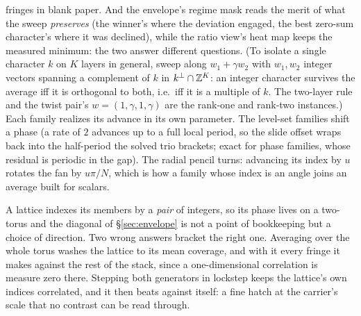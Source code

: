 fringes in blank paper. And the envelope's regime mask reads the merit of
what the sweep \emph{preserves} (the winner's where the deviation engaged,
the best zero-sum character's where it was declined), while the ratio view's
heat map keeps the measured minimum: the two answer different questions. (To isolate a single character $k$ on $K$ layers in
general, sweep along $w_1+\gamma w_2$ with $w_1,w_2$ integer vectors spanning
a complement of $k$ in $k^\perp\cap\mathbb{Z}^K$: an integer character survives the
average iff it is orthogonal to both, i.e.\ iff it is a multiple of $k$. The
two-layer rule and the twist pair's $w=(1,\gamma,1,\gamma)$ are the rank-one
and rank-two instances.) Each family realizes its advance in its own
parameter. The
level-set families shift a phase (a rate of $2$ advances up to a full local
period, so the slide offset wraps back into the half-period the solved trio
brackets; exact for phase families, whose residual is periodic in the gap).
The radial pencil turns: advancing its index by $u$ rotates the fan by
$u\pi/N$, which is how a family whose index is an angle joins an average built
for scalars.

A lattice indexes its members by a \emph{pair} of integers, so its phase lives
on a two-torus and the diagonal of \S\ref{sec:envelope} is not a point of bookkeeping but a
choice of direction. Two wrong answers bracket the right one. Averaging over the
whole torus washes the lattice to its mean coverage, and with it every fringe
it makes against the rest of the stack, since a one-dimensional correlation is
measure zero there. Stepping both generators in lockstep keeps the lattice's own
indices correlated, and it then beats against itself: a fine hatch at the
carrier's scale that no contrast can be read through.

